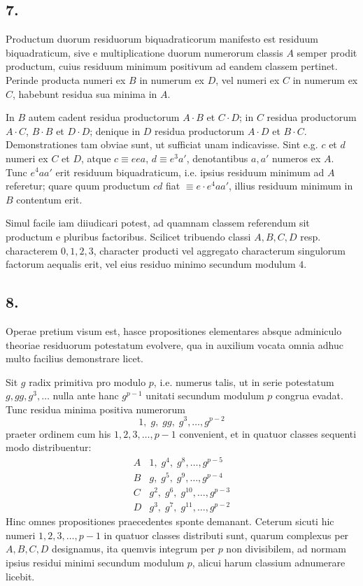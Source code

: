 \documentclass[12pt]{article}
\begin{document}
\subsection*{7.}

Productum duorum residuorum biquadraticorum manifesto est residuum biquadraticum, sive e multiplicatione duorum numerorum classis $A$ semper prodit productum, cuius residuum minimum positivum ad eandem classem pertinet. Perinde producta numeri ex $B$ in numerum ex $D$, vel numeri ex $C$ in numerum ex $C$, habebunt residua sua minima in $A$.

In $B$ autem cadent residua productorum $A\cdot B$ et $C\cdot D$; in $C$ residua productorum $A\cdot C$, $B\cdot B$ et $D\cdot D$; denique in $D$ residua productorum $A\cdot D$ et $B\cdot C$. Demonstrationes tam obviae sunt, ut sufficiat unam indicavisse. Sint e.g. $c$ et $d$ numeri ex $C$ et $D$, atque $c\equiv eea$, $d\equiv e^3a'$, denotantibus $a,a'$ numeros ex $A$. Tunc $e^4aa'$ erit residuum biquadraticum, i.e. ipsius residuum minimum ad $A$ referetur; quare quum productum $cd$ fiat $\equiv e\cdot e^4aa'$, illius residuum minimum in $B$ contentum erit.

Simul facile iam diiudicari potest, ad quamnam classem referendum sit productum e pluribus factoribus. Scilicet tribuendo classi $A,B,C,D$ resp. characterem $0,1,2,3$, character producti vel aggregato characterum singulorum factorum aequalis erit, vel eius residuo minimo secundum modulum $4$.

\subsection*{8.}

Operae pretium visum est, hasce propositiones elementares absque adminiculo theoriae residuorum potestatum evolvere, qua in auxilium vocata omnia adhuc multo facilius demonstrare licet.

Sit $g$ radix primitiva pro modulo $p$, i.e. numerus talis, ut in serie potestatum $g,gg,g^3,\ldots$ nulla ante hanc $g^{p-1}$ unitati secundum modulum $p$ congrua evadat. Tunc residua minima positiva numerorum
\[
1,\;g,\;gg,\;g^3,\ldots,g^{p-2}
\]
praeter ordinem cum his $1,2,3,\ldots,p-1$ convenient, et in quatuor classes sequenti modo distribuentur:
\[
\begin{array}{c|l}
A&1,\;g^4,\;g^8,\ldots,g^{p-5}\\
B&g,\;g^5,\;g^9,\ldots,g^{p-4}\\
C&g^2,\;g^6,\;g^{10},\ldots,g^{p-3}\\
D&g^3,\;g^7,\;g^{11},\ldots,g^{p-2}
\end{array}
\]
Hinc omnes propositiones praecedentes sponte demanant. Ceterum sicuti hic numeri $1,2,3,\ldots,p-1$ in quatuor classes distributi sunt, quarum complexus per $A,B,C,D$ designamus, ita quemvis integrum per $p$ non divisibilem, ad normam ipsius residui minimi secundum modulum $p$, alicui harum classium adnumerare licebit.
\end{document}
